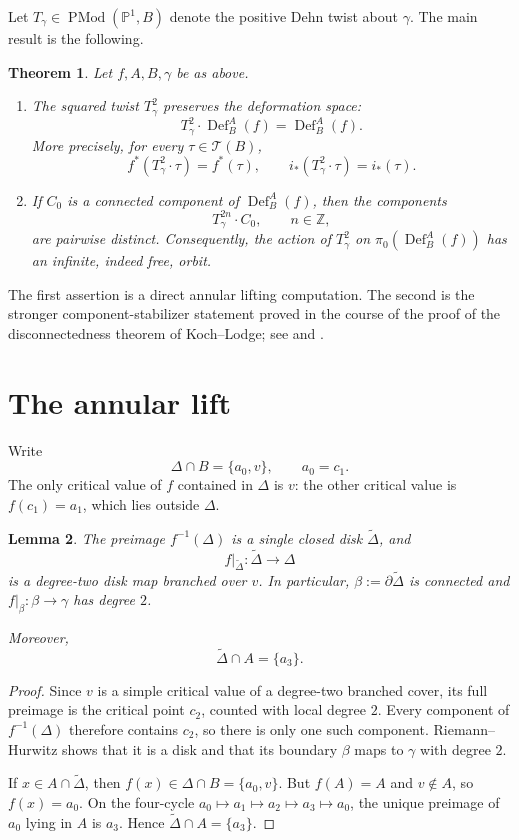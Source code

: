 \documentclass[11pt]{article}
\newtheorem{theorem}{Theorem}[section]
\newtheorem{lemma}[theorem]{Lemma}
\theoremstyle{definition}
\theoremstyle{remark}
\newcommand{\TT}{\mathcal T}
\newcommand{\PMod}{\operatorname{PMod}}
\newcommand{\Def}{\operatorname{Def}}
\begin{document}
Let \(T_\gamma\in\PMod(\mathbb P^1,B)\) denote the positive Dehn twist about
\(\gamma\).  The main result is the following.

\begin{theorem}\label{T:main}
Let \(f,A,B,\gamma\) be as above.
\begin{enumerate}
\item The squared twist \(T_\gamma^2\) preserves the deformation space:
\[
T_\gamma^2\cdot\Def_B^A(f)=\Def_B^A(f).
\]
More precisely, for every \(\tau\in\TT(B)\),
\[
f^*(T_\gamma^2\cdot\tau)=f^*(\tau),
\qquad
i_*(T_\gamma^2\cdot\tau)=i_*(\tau).
\]

\item If \(C_0\) is a connected component of \(\Def_B^A(f)\), then the
components
\[
T_\gamma^{2n}\cdot C_0,\qquad n\in\mathbb Z,
\]
are pairwise distinct.  Consequently, the action of \(T_\gamma^2\) on
\(\pi_0(\Def_B^A(f))\) has an infinite, indeed free, orbit.
\end{enumerate}
\end{theorem}

The first assertion is a direct annular lifting computation.  The second is the
stronger component-stabilizer statement proved in the course of the proof of
the disconnectedness theorem of Koch--Lodge; see \cite[proof of
Theorem~1.3]{KL-arxiv} and \cite{KL-published}.

\section{The annular lift}

Write
\[
\Delta\cap B=\{a_0,v\},\qquad a_0=c_1.
\]
The only critical value of \(f\) contained in \(\Delta\) is \(v\): the other
critical value is \(f(c_1)=a_1\), which lies outside \(\Delta\).

\begin{lemma}\label{L:preimage-disk}
The preimage \(f^{-1}(\Delta)\) is a single closed disk \(\widetilde\Delta\),
and
\[
f|_{\widetilde\Delta}:\widetilde\Delta\longrightarrow\Delta
\]
is a degree-two disk map branched over \(v\).  In particular,
\(\beta:=\partial\widetilde\Delta\) is connected and
\(f|_\beta:\beta\to\gamma\) has degree \(2\).

Moreover,
\[
\widetilde\Delta\cap A=\{a_3\}.
\]
\end{lemma}

\begin{proof}
Since \(v\) is a simple critical value of a degree-two branched cover, its full
preimage is the critical point \(c_2\), counted with local degree \(2\).  Every
component of \(f^{-1}(\Delta)\) therefore contains \(c_2\), so there is only
one such component.  Riemann--Hurwitz shows that it is a disk and that its
boundary \(\beta\) maps to \(\gamma\) with degree \(2\).

If \(x\in A\cap\widetilde\Delta\), then \(f(x)\in\Delta\cap B=\{a_0,v\}\).
But \(f(A)=A\) and \(v\notin A\), so \(f(x)=a_0\).  On the four-cycle
\(a_0\mapsto a_1\mapsto a_2\mapsto a_3\mapsto a_0\), the unique preimage of
\(a_0\) lying in \(A\) is \(a_3\).  Hence
\(\widetilde\Delta\cap A=\{a_3\}\).
\end{proof}
\end{document}
